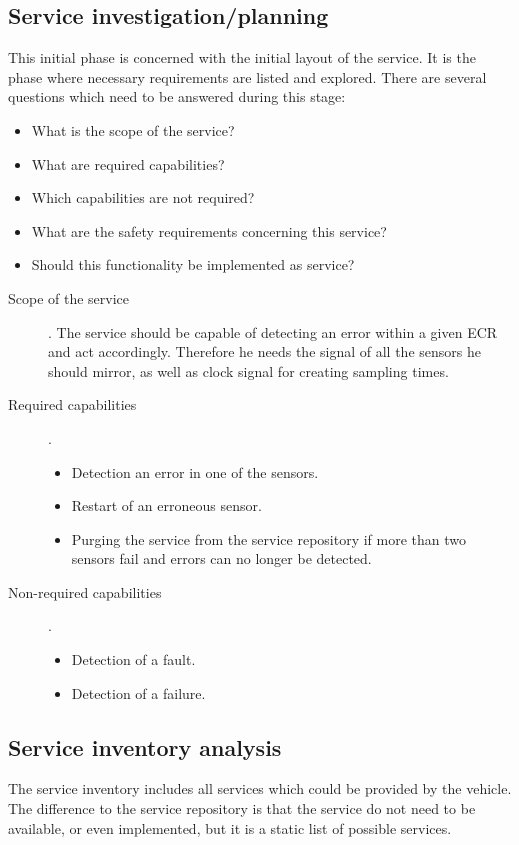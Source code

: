 \subsection{Service investigation/planning}
This initial phase is concerned with the initial layout of the service. It is the phase where necessary requirements are listed and explored. There are several questions which need to be answered during this stage:
\begin{itemize}
\item What is the scope of the service?
\item What are required capabilities?
\item Which capabilities are not required?
\item What are the safety requirements concerning this service?
\item Should this functionality be implemented as service?
\end{itemize}


\begin{mdframed}
\begin{description}
\item [Scope of the service].
The service should be capable of detecting an error within a given ECR and act accordingly. Therefore he needs the signal of all the sensors he should mirror, as well as clock signal for creating sampling times.
\item [Required capabilities].
	\begin{itemize}
	\item Detection an error in one of the sensors.
	\item Restart of an erroneous sensor.
	\item Purging the service from the service repository if more than two sensors fail and errors can no longer be detected.
	\end{itemize}
\item [Non-required capabilities].
	\begin{itemize}
	\item Detection of a fault.
	\item Detection of a failure.
	\end{itemize}
\end{description}
\end{mdframed}







\subsection{Service inventory analysis}
The service inventory includes all services which could be provided by the vehicle. The difference to the service repository is that the service do not need to be available, or even implemented, but it is a static list of possible services.

